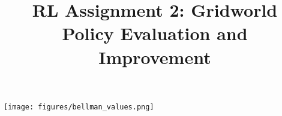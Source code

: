 \documentclass[12pt]{article}
\title{RL Assignment 2: Gridworld Policy Evaluation and Improvement}
\date{}
\begin{document}
\maketitle
\texttt{[image: figures/bellman\_values.png]}
\end{document}
